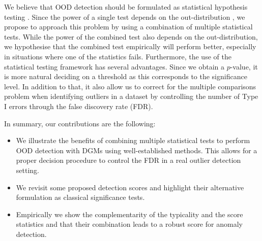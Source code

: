 {We believe that OOD detection should be formulated as statistical hypothesis testing \parencite{nalisnick_detecting_2019, ahmadian_likelihoodfree_2021, haroush_statistical_2021}. Since the power of a single test depends on the out-distribution \parencite{zhang_understanding_2021}, we propose to approach this problem by using a combination of multiple statistical tests. %
While the power of the combined test also depends on the out-distribution, we hypothesise that the combined test empirically will perform better, especially in situations where one of the statistics fails.
%
Furthermore, the use of the statistical testing framework has several advantages. Since we obtain a $p$-value, it is more natural deciding on a threshold as this corresponds to the significance level. In addition to that, it also allow us to correct for the multiple comparisons problem when identifying outliers in a dataset by controlling the number of Type I errors through the false discovery rate (FDR).

In summary, our contributions are the following:
\begin{itemize}
    \item We illustrate the benefits of combining multiple statistical tests to perform OOD detection with DGMs using well-established methods. This allows for a proper decision procedure to control the FDR in a real outlier detection setting.
    \item We revisit some proposed detection scores and highlight their alternative formulation as classical significance tests.
    \item Empirically we show the complementarity of the typicality and the score statistics and that their combination leads to a robust score for anomaly detection. %
\end{itemize}
%

}
